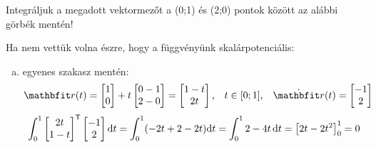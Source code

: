 \documentclass[exercise]{math-standalone}
\begin{document}
\begin{exercise}{%
    Integráljuk a megadott vektormezőt a (0;1) és (2;0) pontok között az alábbi
    görbék mentén!
  }
{    Ha nem vettük volna észre, hogy a függvényünk skalárpotenciális:
    \begin{enumerate}[a)]
      \item egyenes szakasz mentén:
            \[
              \rvec r(t) = \begin{bmatrix}
                1 \\ 0
              \end{bmatrix} + t \begin{bmatrix}
                0 - 1 \\ 2 - 0
              \end{bmatrix} = \begin{bmatrix}
                1 - t \\ 2t
              \end{bmatrix}
              \text, \quad
              t \in [0;1]
              \text, \quad
              \dot{\rvec r}(t) = \begin{bmatrix}
                -1 \\ 2
              \end{bmatrix}
            \]
            \[
              \int_0^1 \begin{bmatrix}
                2t \\ 1 - t
              \end{bmatrix}^{\mathsf{T}}
              \begin{bmatrix}
                -1 \\ 2
              \end{bmatrix}
              \mathrm{d} t
              = \int_0^1 (-2t + 2 - 2t) \mathrm{d} t
              = \int_0^1 2 - 4t \, \mathrm{d} t
              = \left[ 2t - 2t^2 \right]_0^1
              = 0
            \]


\end{enumerate}}
\end{exercise}
\end{document}
